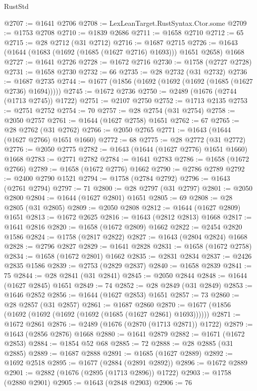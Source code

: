 \begin{lexlean}{RustStd}
\begin{coremodule}
@2707 := @1641 @2706
@2708 := LexLeanTarget.RustSyntax.Ctor.some
@2709 := @1753 @2708
@2710 := @1839 @2686
@2711 := @1658 @2710
@2712 := 65
@2715 := @28 @2712 (@31 @2712)
@2716 := @1687 @2715
@2726 := @1643 (@1644 (@1683 (@1692 (@1685 (@1627 @2716) @1693))) @1651 @2658) @1668
@2727 := @1641 @2726
@2728 := @1672 @2716
@2730 := @1758 (@2727 @2728)
@2731 := @1658 @2730
@2732 := 66
@2735 := @28 @2732 (@31 @2732)
@2736 := @1687 @2735
@2744 := @1677 (@1856 (@1692 (@1692 (@1692 (@1685 (@1627 @2736) @1694)))))
@2745 := @1672 @2736
@2750 := @2489 (@1676 (@2744 (@1713 @2745)) @1722)
@2751 := @2107 @2750
@2752 := @1713 @2135
@2753 := @2751 @2752
@2754 := 70
@2757 := @28 @2754 (@31 @2754)
@2758 := @2050 @2757
@2761 := @1644 (@1627 @2758) @1651
@2762 := 67
@2765 := @28 @2762 (@31 @2762)
@2766 := @2050 @2765
@2771 := @1643 (@1644 (@1627 @2766) @1651 @1660)
@2772 := 68
@2775 := @28 @2772 (@31 @2772)
@2776 := @2050 @2775
@2782 := @1643 (@1644 (@1627 @2776) @1651 @1660) @1668
@2783 := @2771 @2782
@2784 := @1641 @2783
@2786 := @1658 (@1672 @2766)
@2789 := @1658 (@1672 @2776) @1662
@2790 := @2786 @2789
@2792 := @2400 @2790 @1521
@2794 := @1758 (@2784 @2792)
@2796 := @1643 (@2761 @2794)
@2797 := 71
@2800 := @28 @2797 (@31 @2797)
@2801 := @2050 @2800
@2804 := @1644 (@1627 @2801) @1651
@2805 := 69
@2808 := @28 @2805 (@31 @2805)
@2809 := @2050 @2808
@2812 := @1644 (@1627 @2809) @1651
@2813 := @1672 @2625
@2816 := @1643 (@2812 @2813) @1668
@2817 := @1641 @2816
@2820 := @1658 (@1672 @2809) @1662
@2822 := @2454 @2820 @1586
@2824 := @1758 (@2817 @2822)
@2827 := @1643 (@2804 @2824) @1668
@2828 := @2796 @2827
@2829 := @1641 @2828
@2831 := @1658 (@1672 @2758)
@2834 := @1658 (@1672 @2801) @1662
@2835 := @2831 @2834
@2837 := @2426 @2835 @1586
@2839 := @2753 (@2829 @2837)
@2840 := @1658 @2839
@2841 := 75
@2844 := @28 @2841 (@31 @2841)
@2845 := @2050 @2844
@2848 := @1644 (@1627 @2845) @1651
@2849 := 74
@2852 := @28 @2849 (@31 @2849)
@2853 := @1646 @2852
@2856 := @1644 (@1627 @2853) @1651
@2857 := 73
@2860 := @28 @2857 (@31 @2857)
@2861 := @1687 @2860
@2870 := @1677 (@1856 (@1692 (@1692 (@1692 (@1692 (@1685 (@1627 @2861) @1693))))))
@2871 := @1672 @2861
@2876 := @2489 (@1676 (@2870 (@1713 @2871)) @1722)
@2879 := @1643 (@2856 @2876) @1668
@2880 := @1641 @2879
@2882 := @1671 (@1672 @2853)
@2884 := @1854 @52 @68
@2885 := 72
@2888 := @28 @2885 (@31 @2885)
@2889 := @1687 @2888
@2891 := @1685 (@1627 @2889)
@2892 := @1692 @2518
@2895 := @1677 (@2884 (@2891 @2892))
@2896 := @1672 @2889
@2901 := @2882 (@1676 (@2895 (@1713 @2896)) @1722)
@2903 := @1758 (@2880 @2901)
@2905 := @1643 (@2848 @2903)
@2906 := 76

\end{coremodule}
\end{lexlean}
